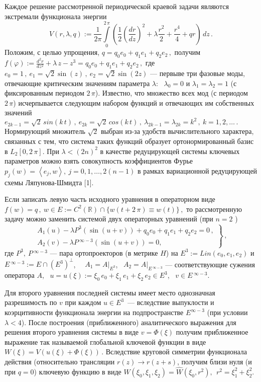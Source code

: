 Каждое решение рассмотренной периодической краевой задачи являются
экстремали функционала энергии
 $$
V (r, \lambda, q):= \frac1{2\pi}\int\limits_0^{2\,\pi}
\left(\frac12\left(\frac{dr}{dz}\right)^2  +   \lambda  \frac{r^2}2
+ \frac{r^4}4 + qr\right)\,dz\,.
 $$
Положим, с целью упрощения,  $q = q_0e_0 + q_1e_1 + q_2e_2\,,$
получим
 $
f(\varphi):=\frac{d^2 r}{dz^2} + \lambda\,z - z^3 = q_0e_0 + q_1e_1
+ q_2e_2\,,
 $
где $ e_0 = 1\,, \  e_1=\sqrt {2}\sin(z)\,, \  e_2=\sqrt
{2}\sin(2z)$
--- первыве три фазовые моды, отвечающие критическим значениям
параметра $\lambda$: \ $\lambda_0=0$  и $\lambda_1=\lambda_2=1$ (с
фиксированным периодом $2\,\pi$). Известно, что множество всех мод
(с периодом $2\,\pi$) исчерпывается следующим набором функций и
отвечающих им собственных значений
 $
e_{2k-1} = \sqrt2\,sin(k\,t)\,,  \ e_{2k} = \sqrt2\,cos(k\,t)\,, \
\lambda_{2k-1} = \lambda_{2k} = k^2\,, \ k=1,2,\dots \,.
 $
Нормирующий множитель $\sqrt2$ выбран из-за удобств вычислительного
характера, связанных с тем, что система таких функций образует
ортонормированный базис в $L_2[0,2\,\pi]$. При $\lambda<(2n)^2$ в
качестве редуцирующей системы ключевых параметров можно взять
совокупность коэффициентов Фурье
 $
p_j(w)=\left<e_j,w\right>,\ j=0,1,\ldots,2(n-1)
 $
в рамках вариационной редуцирующей схемы Ляпунова-Шмидта [1].

Если записать левую часть исходного уравнения в операторном виде
 $
f (w) =q\,, \  w\in E:=C^2(\mathbb{R})\cap\{w(t+2\,\pi)\equiv
w(t)\}\,,
 $
то рассмотренную задачу можно заменить системой двух операторных
уравнений (при $n=2$ )
 $$
 \left.
\begin{array}{l}
A_1 \left( u \right) - \lambda P^3 \left(\sin( u+v) \right)
+q_0e_0+q_1e_1+q_2e_2 = 0\,,
\\
A_2( v ) - \lambda P\,^{\infty-3}
 \left( \sin(u+v)\right) =0,
\end{array}\right\}\,,
  $$
где $P^3,\ P\,^{\infty-3}$ --- пара ортопроекторов (в метрике $H$)
на $E^3:=Lin(e_0,e_1,e_2)$ и
$E\,^{\infty-3}:=E\cap\left(E^3\right)^\perp$, \ \ $A_1 =
A\vert_{E^3}$, \ $A_2 = A\vert_{E\,^{\infty-3}}$ --- соответствующие
сужения оператора $A$, \ $u = u(\xi):=\xi_0\,e_0 + \xi_1\,e_1 +
\xi_2\,e_2 \in E^3$, \ $v\in E\,^{\infty-3}$.

Для второго уравнения последней системы имеет место однозначная
разре\-ши\-мость по $v$ при каждом $u\in E^3$~--- всле\-д\-с\-т\-вие
выпуклости и коэрцитивности функционала энергии на подпространстве
$E^{\infty-3}$ (при условии $\lambda<4$). После построения
(приближенного) аналитического выражения для решения второго
уравнения системы  в виде $v=\Phi(\xi)$ получим приближенное
выражение так называемой глобальной ключевой функции в виде
 $
W(\xi)=V\left(u(\xi)+\Phi(\xi)\right)\,.
 $
Вследствие круговой симметрии функционала действия (относительно
трансляции  $r(z) \longrightarrow r(z+s)$, получим близи нуля (и при
$ q=0$) ключевую функцию в виде
 $
W(\xi_0,\xi_1,\xi_2) = \widehat{W}(\xi_0,r^2), \ \
r^2=\xi_1^2+\xi_2^2.
 $



